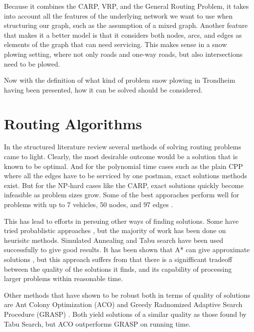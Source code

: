 Because it combines the CARP, VRP, and the General Routing Problem, it takes into account all the features of the underlying network we want to use when structuring our graph, such as the assumption of a mixed graph. Another feature that makes it a better model is that it considers both nodes, arcs, and edges as elements of the graph that can need servicing. This makes sense in a snow plowing setting, where not only roads and one-way roads, but also intersections need to be plowed.

Now with the definition of what kind of problem snow plowing in Trondheim having been presented, how it can be solved should be considered.




\section{Routing Algorithms} %
\label{sec:routing_algorithms}

In the structured literature review several methods of solving routing problems came to light. Clearly, the most desirable outcome would be a solution that is known to be optimal. And for the polynomial time cases such as the plain CPP where all the edges have to be serviced by one postman, exact solutions methods exist. But for the NP-hard cases like the CARP, exact solutions quickly become infeasible as problem sizes grow. Some of the best apporaches perform well for problems with up to 7 vehicles, 50 nodes, and 97 edges \citep{belenguer2003cutting}.

This has lead to efforts in persuing other ways of finding solutions. Some have tried probablistic approaches \citep{christiansen2009branch}, but the majority of work has been done on heurisitc methods. Simulated Annealing \citep{eglese1994simulatedAnnealing} and Tabu search \citep{brandao2008tabu} have been used successfully to give good results. It has been shown that A* can give approximate solutions \citep{rao2011AStar}, but this approach suffers from that there is a signifficant tradeoff between the quality of the solutions it finds, and its capability of processing larger problems within reasonable time.

Other methods that have shown to be robust both in terms of quality of solutions are Ant Colony Optimization (ACO) \citep{santos2010ACO} and Greedy Radnomized Adaptive Search Procedure (GRASP) \citep{usberti2013grasp}. Both yield solutions of a similar quality as those found by Tabu Search, but ACO outperforms GRASP on running time.

